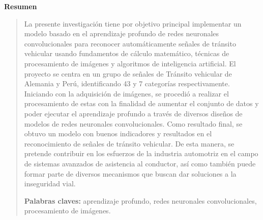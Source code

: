  \newpage
  \begin{center}
   {\bf\LARGE Resumen}
  \end{center} 
  \vskip 0.5cm
  \begin{quotation}
  
  La presente investigación tiene por objetivo principal implementar un modelo basado en el aprendizaje profundo de redes neuronales convolucionales para reconocer automáticamente señales de tránsito vehicular usando fundamentos de cálculo matemático, técnicas de procesamiento de imágenes y algoritmos de inteligencia artificial.
  \vskip 0.2cm
  El proyecto se centra en un grupo de señales de Tránsito vehicular de Alemania y Perú, identificando 43 y 7 categorías respectivamente. Iniciando con  la adquisición de imágenes, se procedió a realizar el procesamiento de estas con la finalidad de aumentar el conjunto de datos y poder ejecutar el aprendizaje profundo a través de diversos diseños de modelos de redes neuronales convolucionales.
  \vskip 0.2cm
  Como resultado final, se obtuvo un modelo con buenos indicadores y resultados en el reconocimiento de señales de tránsito vehicular. De esta manera, se pretende contribuir en los esfuerzos de la industria automotriz en el campo de sistemas avanzados de asistencia al conductor, así como también puede formar parte de diversos mecanismos que buscan dar soluciones a la inseguridad vial.

  \vskip 0.2cm
  {\bf Palabras claves:} aprendizaje profundo, redes neuronales convolucionales, procesamiento de imágenes.
  \end{quotation}


